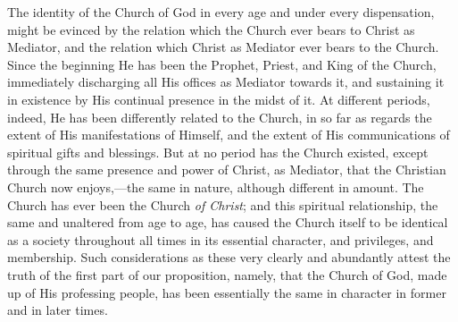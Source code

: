 \documentclass[english,]{book}
\begin{document}
\begin{enumerate}
  The identity of the Church of God in every age and under every dispensation, might be evinced by the relation which the Church ever bears to Christ as Mediator, and the relation which Christ as Mediator ever bears to the Church. Since the beginning He has been the Prophet, Priest, and King of the Church, immediately discharging all His offices as Mediator towards it, and sustaining it in existence by His continual presence in the midst of it. At different periods, indeed, He has been differently related to the Church, in so far as regards the extent of His manifestations of Himself, and the extent of His communications of spiritual gifts and blessings. But at no period has the Church existed, except through the same presence and power of Christ, as Mediator, that the Christian Church now enjoys,---the same in nature, although different in amount. The Church has ever been the Church \emph{of Christ}; and this spiritual relationship, the same and unaltered from age to age, has caused the Church itself to be identical as a society throughout all times in its essential character, and privileges, and membership. Such considerations as these very clearly and abundantly attest the truth of the first part of our proposition, namely, that the Church of God, made up of His professing people, has been essentially the same in character in former and in later times.
\end{enumerate}
\end{document}
